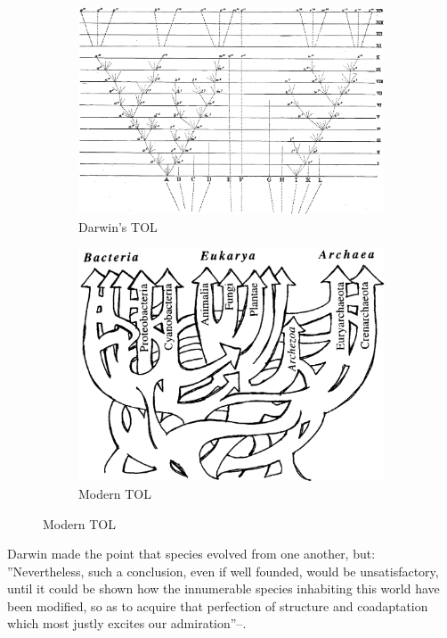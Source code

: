 \documentclass[]{article}
\begin{document}
\begin{figure}[H]
	\caption{Two views of the Tree of Life}
	\begin{subfigure}[b]{0.45\textwidth}
		\caption{Darwin's TOL\cite{darwin1859origin}}\label{fig:TOL:Darwin}
		\includegraphics[width=\textwidth]{TOL_Darwin}
	\end{subfigure}
	\begin{subfigure}[b]{0.45\textwidth}
		\caption{Modern TOL}\label{fig:TOL:Modern}
		\includegraphics[width=\textwidth]{TOL-5-6}
	\end{subfigure}
\end{figure}

Darwin made the point that species evolved from one another, but: ''Nevertheless, such a conclusion, even if well founded, would be unsatisfactory, until it could be shown how the innumerable species inhabiting this world have been modified, so as to acquire that perfection of structure and coadaptation which most justly excites our admiration''--\cite{darwin1859origin}.
\end{document}
